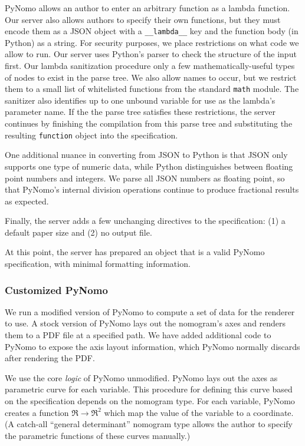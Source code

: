 \documentclass{proc}
\begin{document}
PyNomo allows an author to enter an arbitrary function as a lambda
function.
Our server also allows authors to specify their own functions, but
they must encode them as a JSON object with a \texttt{\_\_lambda\_\_} key
and the function body (in Python) as a string.
For security purposes, we place restrictions on what code we allow to
run.
Our server uses Python's parser to check the structure of the input
first.
Our lambda sanitization procedure only a few mathematically-useful
types of nodes to exist in the parse tree.
We also allow names to occur, but we restrict them to a small list of
whitelisted functions from the standard \texttt{math} module.
The sanitizer also identifies up to one unbound variable for use as
the lambda's parameter name.
If the the parse tree satisfies these restrictions, the server
continues by finishing the compilation from this parse tree and
substituting the resulting \texttt{function} object into the
specification.

One additional nuance in converting from JSON to Python is that JSON
only supports one type of numeric data, while Python distinguishes
between floating point numbers and integers.
We parse all JSON numbers as floating point, so that PyNomo's internal
division operations continue to produce fractional results as
expected.

Finally, the server adds a few unchanging directives to the
specification: (1) a default paper size and (2) no output file.

At this point, the server has prepared an object that is a valid
PyNomo specification, with minimal formatting information.

\subsubsection{Customized PyNomo}
We run a modified version of PyNomo to compute a set of data for the
renderer to use.
A stock version of PyNomo lays out the nomogram's axes and renders
them to a PDF file at a specified path.
We have added additional code to PyNomo to expose the axis layout
information, which PyNomo normally discards after rendering the PDF.

We use the core \emph{logic} of PyNomo unmodified.
PyNomo lays out the axes as parametric curve for each variable.
This procedure for defining this curve based on the specification
depends on the nomogram type.
For each variable, PyNomo creates a function
$\Re\rightarrow\Re^2$ which map the value of the variable to a
coordinate.
(A catch-all ``general determinant'' nomogram type allows the author
to specify the parametric functions of these curves manually.)
\end{document}
